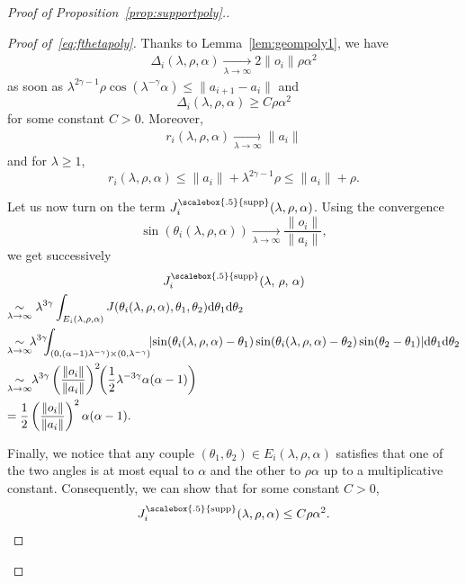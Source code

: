 \documentclass[AHL,Unicode,longabstracts,published]{cedram}
\newcommand{\dd}{\mathrm{d}}
\DeclareMathOperator{\supp}{\scalebox{.5}{supp}}
\newcommand{\pass}{\vspace{0.3cm}\noindent}
\newcommand{\noi}{\noindent}
\newenvironment*{prooff}{\begin{proof}}{\let\qed\relax\end{proof}}
\begin{document}
\begin{proof}[{Proof of Proposition~\ref{prop:supportpoly}.}]
\begin{prooff}[{Proof of~\eqref{eq:fthetapoly}}]
Thanks to Lemma~\ref{lem:geompoly1}, we have
\begin{align*}
\Delta_i(\lambda,\rho,\alpha) \underset{\lambda\to\infty}{\longrightarrow} 2\|o_i\|\rho\alpha^2
\end{align*}
as soon as $\lambda^{2\gamma-1}\rho\cos(\lambda^{-\gamma}\alpha)\le \|a_{i+1}-a_i\|$ and
\begin{equation}\label{eq:dominDeltapolyg}
\Delta_i(\lambda,\rho,\alpha)\ge C \rho \alpha^2
\end{equation}
for some constant $C>0$. Moreover,
\begin{align*}
r_i(\lambda,\rho,\alpha) \underset{\lambda\to\infty}{\longrightarrow} \|a_i\|
\end{align*}
and for $\lambda\ge 1$,
\begin{equation}\label{eq:dominripolyg}
r_i(\lambda,\rho,\alpha)\le \|a_i\|+\lambda^{2\gamma-1}\rho\le \|a_i\|+\rho.
\end{equation}

Let us now turn on the term $J^{\supp}_i(\lambda,\rho,\alpha)$. Using the convergence
\[
\sin(\theta_i(\lambda,\rho,\alpha))\underset{\lambda\to\infty}{\longrightarrow} \frac{\|o_i\|}{\|a_i\|},
\]
we get successively
\begin{multline*}
J^{\supp}_i(\lambda,\,\rho,\,\alpha) \\
\begin{aligned}
& \!\!\underset{\lambda\to\infty}{\sim} \lambda^{3\gamma}\int_{E_i(\lambda,\rho,\alpha)}J(\theta_i(\lambda,\rho,\alpha),\theta_1,\theta_2)\dd \theta_1\dd \theta_2 \\
&\!\! \underset{\lambda\to\infty}{\sim}\!\!\!\lambda^{3\gamma}\!\!\!\int_{\left(0,(\alpha-1)\lambda^{-\gamma}\right)\times(0,\lambda^{-\gamma})}\!\!\left|\sin(\theta_i(\lambda,\rho,\alpha)-\theta_1)\sin(\theta_i(\lambda,\rho,\alpha)-\theta_2)\sin(\theta_2-\theta_1)\right|\!\dd \theta_1\dd \theta_2 \\
&\!\! \underset{\lambda\to\infty}{\sim}\!\!\lambda^{3\gamma}\left(\frac{\|o_i\|}{\|a_i\|}\right)^2 \!\!\left(\frac1{2}\lambda^{-3\gamma}\alpha(\alpha-1)\right) \\
&\!\! = \frac1{2}\left(\frac{\|o_i\|}{\|a_i\|}\right)^2\alpha(\alpha-1).
\end{aligned}
\end{multline*}

Finally, we notice that any couple $(\theta_1,\theta_2)\in E_i(\lambda,\rho,\alpha)$ satisfies that one of the two angles is at most equal to $\alpha$ and the other to $\rho\alpha$ up to a multiplicative constant. Consequently, we can show that for some constant $C>0$,
\begin{equation}\label{eq:dominJpolyg}
J^{\supp}_i(\lambda,\rho,\alpha)\le C\rho\alpha^2.
\end{equation}


\end{prooff}
\end{proof}
\end{document}
